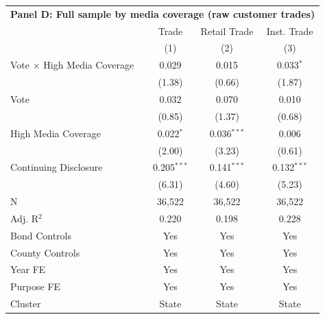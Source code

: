 \begingroup
\centering
\begin{tabular*}{\textwidth}{@{\extracolsep{\fill}}lccc}
\multicolumn{5}{l}{\textbf{Panel D: Full sample by media coverage (raw customer trades)}}\\

\addlinespace
   \toprule
                                      & Trade         & Retail Trade  & Inst. Trade\\  
                                      & (1)           & (2)           & (3)\\  
   \midrule 
   Vote $\times$ High Media Coverage  & 0.029         & 0.015         & 0.033$^{*}$\\   
                                      & (1.38)       & (0.66)       & (1.87)\\   
   Vote                               & 0.032         & 0.070         & 0.010\\   
                                      & (0.85)       & (1.37)       & (0.68)\\   
   High Media Coverage                & 0.022$^{*}$   & 0.036$^{***}$ & 0.006\\   
                                      & (2.00)       & (3.23)       & (0.61)\\   
   Continuing Disclosure              & 0.205$^{***}$ & 0.141$^{***}$ & 0.132$^{***}$\\   
                                      & (6.31)       & (4.60)       & (5.23)\\   
   \hline
   N                       & 36,522        & 36,522        & 36,522\\  
   Adj. R$^2$                     & 0.220         & 0.198         & 0.228\\  
   Bond Controls                      & Yes           & Yes           & Yes\\  
   County Controls                    & Yes           & Yes           & Yes\\  
   Year FE                            & Yes           & Yes           & Yes\\  
   Purpose FE                         & Yes           & Yes           & Yes\\  
   Cluster              & State & State & State\\  
   \bottomrule
\end{tabular*}
\par\endgroup
